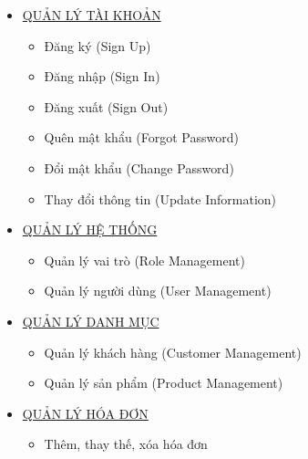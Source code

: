 \begin{itemize}

\item \underline{{QUẢN LÝ TÀI KHOẢN}}

\begin{itemize}

\item Đăng ký (Sign Up)

\item Đăng nhập (Sign In)

\item Đăng xuất (Sign Out)

\item Quên mật khẩu (Forgot Password)

\item Đổi mật khẩu (Change Password)

\item Thay đổi thông tin (Update Information)

\end{itemize}

\item \underline{{QUẢN LÝ HỆ THỐNG}}

\begin{itemize}

\item Quản lý vai trò (Role Management)

\item Quản lý người dùng (User Management)

\end{itemize}

\item \underline{{QUẢN LÝ DANH MỤC}}

\begin{itemize}

\item Quản lý khách hàng (Customer Management)

\item Quản lý sản phẩm (Product Management)

\end{itemize}

\item \underline{{QUẢN LÝ HÓA ĐƠN}}

\begin{itemize}

\item Thêm, thay thế, xóa hóa đơn

\end{itemize}


\end{itemize}
